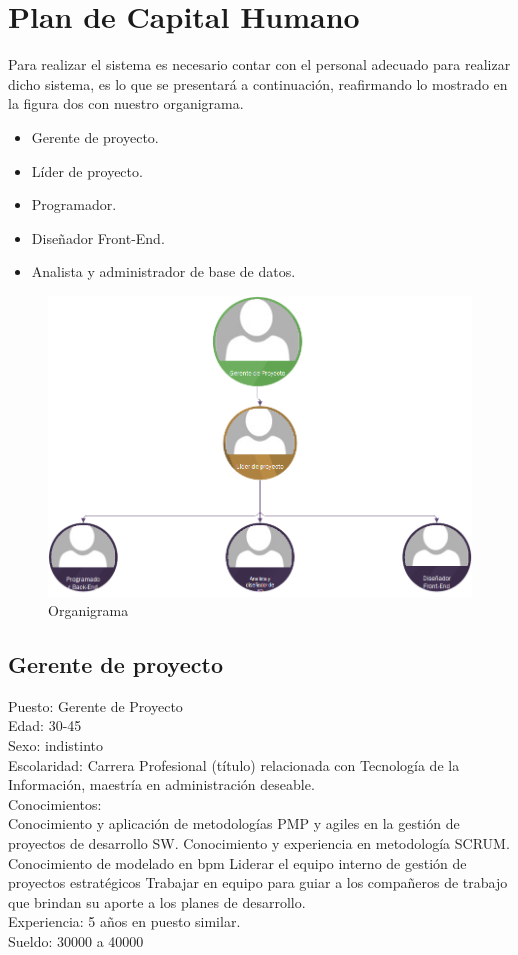 \documentclass[12pt,letterpaper]{article}
\begin{document}
\section{Plan de Capital Humano}
Para realizar el sistema es necesario contar con el personal adecuado para realizar dicho sistema, es lo que se presentará a continuación, reafirmando lo mostrado en la figura dos con nuestro organigrama.\\

	\begin{itemize}
	\item Gerente de proyecto. 
	\item Líder de proyecto.
	\item Programador.
	\item Diseñador Front-End.
	\item Analista y administrador de base de datos.
	\end{itemize}
	 
	
\begin{figure}
   \centering
   \includegraphics[scale=0.50]{Organigrama.png}
   \caption{Organigrama}
   \label{fig:my_label}
\end{figure}
\subsection*{Gerente de proyecto}
Puesto: Gerente de Proyecto\\ 
Edad: 30-45\\
Sexo: indistinto\\
Escolaridad: Carrera Profesional (título) relacionada con Tecnología de la Información, maestría en administración deseable.\\
Conocimientos: \\
Conocimiento y aplicación de metodologías PMP y agiles en la gestión de proyectos de desarrollo SW. 
Conocimiento y experiencia en metodología SCRUM. 
Conocimiento de modelado en bpm
Liderar el equipo interno de gestión de proyectos estratégicos 
Trabajar en equipo para guiar a los compañeros de trabajo que brindan su aporte a los planes de desarrollo.\\
Experiencia:  5 años en puesto similar. \\
Sueldo: 30000 a 40000\\
\end{document}
